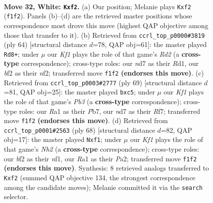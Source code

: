 \documentclass[11pt]{article}
\begin{document}
\clearpage

\begin{figure}[p]\centering
\begin{subfigure}{0.46\textwidth}\centering
\resizebox{\linewidth}{!}{%
\newchessgame
\chessboard[
  setfen={2Q5/pp1n2kp/7p/1P1q4/3P4/3r4/4Nb2/R4K1R w - - 0 32},
  showmover=false,
  pgfstyle=straightmove, color=movearrow, markmove={f1-f2}
]}
\caption{}
\end{subfigure}\hfill
\begin{subfigure}{0.46\textwidth}\centering
\resizebox{\linewidth}{!}{%
\newchessgame
\chessboard[
  setfen={N1r3k1/4pp1p/p5p1/Q7/1P6/4Pq2/3R1n1P/3R2K1 w - - 0 33},
  showmover=false,
  pgfstyle=straightmove, color=movearrow, markmove={d2-d8}
]}
\caption{}
\end{subfigure}
\\[4pt]
\begin{subfigure}{0.46\textwidth}\centering
\resizebox{\linewidth}{!}{%
\newchessgame
\chessboard[
  setfen={k2r4/1p3rb1/1pn1Q2p/2B5/6p1/P7/KP4P1/3R4 b - - 0 35},
  showmover=false,
  pgfstyle=straightmove, color=movearrow, markmove={b6-c5}
]}
\caption{}
\end{subfigure}\hfill
\begin{subfigure}{0.46\textwidth}\centering
\resizebox{\linewidth}{!}{%
\newchessgame
\chessboard[
  setfen={2b2r2/p4q2/1p5k/3pp1R1/5P2/3QP3/PP5N/5nK1 w - - 1 35},
  showmover=false,
  pgfstyle=straightmove, color=movearrow, markmove={h2-f1}
]}
\caption{}
\end{subfigure}
\caption{\textbf{Move 32, White: \texttt{Kxf2}.} (a) Our position; Melanie plays \texttt{Kxf2} (\texttt{f1f2}). Panels (b)--(d) are the retrieved master positions whose correspondence most drove this move (highest QAP objective among those that transfer to it). (b) Retrieved from \texttt{ccrl\_top\_p0000\#3819} (ply 64) [structural distance $d$=78, QAP obj=61]: the master played \texttt{Rd8+}; under $\mu$ our \emph{Kf1} plays the role of that game's \emph{Rd2} (a \textbf{cross-type} correspondence); cross-type roles: our \emph{n}d7 as their \emph{R}d1, our \emph{b}f2 as their \emph{n}f2; transferred move \texttt{f1f2} \textbf{(endorses this move)}. (c) Retrieved from \texttt{ccrl\_top\_p0003\#2777} (ply 69) [structural distance $d$=81, QAP obj=25]: the master played \texttt{bxc5}; under $\mu$ our \emph{Kf1} plays the role of that game's \emph{Pb3} (a \textbf{cross-type} correspondence); cross-type roles: our \emph{R}a1 as their \emph{P}b7, our \emph{n}d7 as their \emph{R}f7; transferred move \texttt{f1f2} \textbf{(endorses this move)}. (d) Retrieved from \texttt{ccrl\_top\_p0001\#2563} (ply 68) [structural distance $d$=82, QAP obj=17]: the master played \texttt{Nxf1}; under $\mu$ our \emph{Kf1} plays the role of that game's \emph{Nh2} (a \textbf{cross-type} correspondence); cross-type roles: our \emph{b}f2 as their \emph{n}f1, our \emph{R}a1 as their \emph{P}a2; transferred move \texttt{f1f2} \textbf{(endorses this move)}. Synthesis: 8 retrieved analogs transferred to \texttt{Kxf2} (summed QAP objective 134, the strongest correspondence among the candidate moves); Melanie committed it via the \texttt{search} selector.}
\label{fig:thought-m62}
\end{figure}
\end{document}
